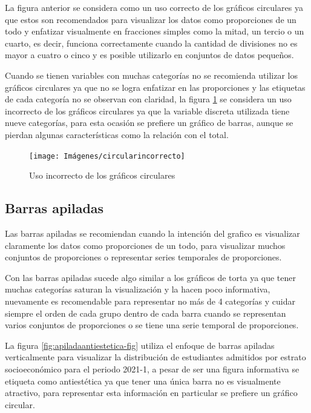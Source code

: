 \documentclass[
]{book}
\begin{document}
La figura anterior se considera como un uso correcto de los gráficos circulares ya que estos son recomendados para visualizar los datos como proporciones de un todo y enfatizar visualmente en fracciones simples como la mitad, un tercio o un cuarto, es decir, funciona correctamente cuando la cantidad de divisiones no es mayor a cuatro o cinco y es posible utilizarlo en conjuntos de datos pequeños.

Cuando se tienen variables con muchas categorías no se recomienda utilizar los gráficos circulares ya que no se logra enfatizar en las proporciones y las etiquetas de cada categoría no se observan con claridad, la figura \ref{fig:circularincorrecto-fig} se considera un uso incorrecto de los gráficos circulares ya que la variable discreta utilizada tiene nueve categorías, para esta ocasión se prefiere un gráfico de barras, aunque se pierdan algunas características como la relación con el total.

\begin{figure}

{\centering \texttt{[image: Imágenes/circularincorrecto]} 

}

\caption{Uso incorrecto de los gráficos circulares}\label{fig:circularincorrecto-fig}
\end{figure}

\hypertarget{barras-apiladas}{%
\subsection{Barras apiladas}\label{barras-apiladas}}

Las barras apiladas se recomiendan cuando la intención del grafico es visualizar claramente los datos como proporciones de un todo, para visualizar muchos conjuntos de proporciones o representar series temporales de proporciones.

Con las barras apiladas sucede algo similar a los gráficos de torta ya que tener muchas categorías saturan la visualización y la hacen poco informativa, nuevamente es recomendable para representar no más de 4 categorías y cuidar siempre el orden de cada grupo dentro de cada barra cuando se representan varios conjuntos de proporciones o se tiene una serie temporal de proporciones.

La figura \ref{fig:apiladaantiestetica-fig} utiliza el enfoque de barras apiladas verticalmente para visualizar la distribución de estudiantes admitidos por estrato socioeconómico para el periodo 2021-1, a pesar de ser una figura informativa se etiqueta como antiestética ya que tener una única barra no es visualmente atractivo, para representar esta información en particular se prefiere un gráfico circular.
\end{document}
